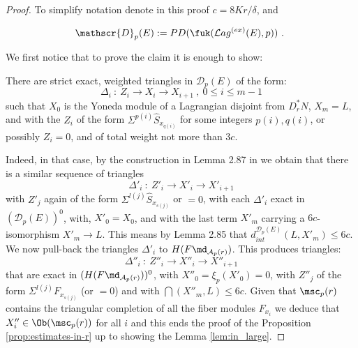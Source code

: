 \begin{proof} To simplify notation denote in this proof $c= 8Kr/\delta$, and 

\begin{equation} \label{eq:amb_Fuk}
\mathscr{D}_{p}(E):=PD(\fuk(\mathcal{L}ag^{(ex)}(E), p))~.~
\end{equation}

We first notice that to prove the claim it is enough to show:
\begin{lem}\label{lem:in_large} There are strict exact, weighted triangles in
$\mathscr{D}_{p}(E)$ of the form:
\begin{equation}\label{eq:iterated_cones1}
\Delta_{i} \ : \ Z_{i}\longrightarrow X_{i}\longrightarrow X_{i+1} \  , \ 0\leq i \leq m-1
\end{equation}
 such that $X_{0}$ is the Yoneda module of a Lagrangian disjoint from $D^{\ast}_{r}N$,  $ X_{m}= L$, and with the $Z_{i}$ of the form $\Sigma^{p(i)}\hat{S}_{x_{q(i)}}$ for some integers $p(i), q(i)$,  or possibly $Z_{i}=0$, and of total weight not more than $3c$. 
\end{lem}


Indeed, in that case, by the construction in Lemma 2.87
in \cite{BCZ:tpc} we obtain that there is a similar sequence  of triangles
\begin{equation*}\label{eq:iterated_cones2}
\Delta'_{i} \ : \ Z'_{i}\longrightarrow X'_{i}\longrightarrow X'_{i+1}
\end{equation*}
with $Z'_{j}$ again of the form $\Sigma^{l(j)}\hat{S}_{x_{s(j)}}$ or $=0$,
 with each $\Delta'_{i}$  exact in
 $(\mathscr{D}_{p}(E))^{0}$, with, $X'_{0}=X_{0}$, and with the last term $X'_{m}$ carrying a $6c$-isomorphism $X'_{m}\to L$. This means
by Lemma 2.85  \cite{BCZ:tpc} that $d_{int}^{\mathscr{D}_{p}(E)}(L,X'_{m})\leq 6c$. We now pull-back the triangles 
$\Delta'_{i}$ to  $H(F\md_{\mathcal{A}_{p}(r)})$. This produces triangles: 
$$
\Delta''_{i} \ : \ Z''_{i}\longrightarrow X''_{i}\longrightarrow X''_{i+1}
$$
that are exact in $(H(F\md_{\mathcal{A}_{p}(r)}))^{0}$, with $X''_{0}=\xi_{p}(X'_{0})=0$, with $Z''_{j}$ of the form
$\Sigma^{l(j)}F_{x_{s(j)}}$ (or $=0$) and with $\dint (X''_{m},L)\leq 6c$. Given that $\msc_{p}(r)$ contains the triangular completion of all the fiber modules $F_{x_{i}}$ we deduce that $X''_{i}\in \Ob (\msc_{p}(r))$ for all $i$ and this ends the proof of 
the Proposition \ref{prop:estimates-in-r} up to showing the Lemma \ref{lem:in_large}.
\end{proof}

